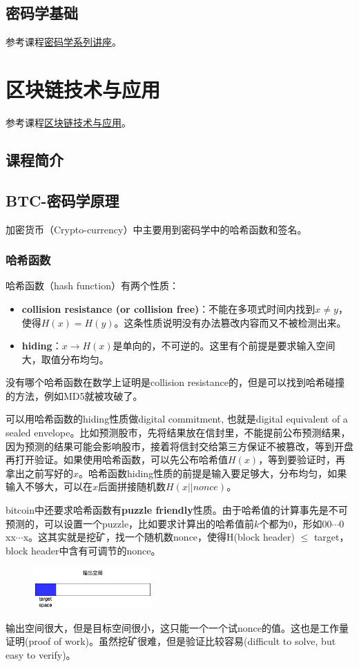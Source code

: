 \documentclass[10pt]{ctexart}
\begin{document}
\subsection{密码学基础}
参考课程\href{https://www.bilibili.com/video/BV18T411k74f/?spm_id_from=333.788&vd_source=c6586ed2410fae637f393017e00f4845}{密码学系列讲座}。
\section{区块链技术与应用}
参考课程\href{http://zhenxiao.com/blockchain/}{区块链技术与应用}。
\subsection{课程简介}
 
\subsection{BTC-密码学原理}
加密货币（Crypto-currency）中主要用到密码学中的哈希函数和签名。
\subsubsection{哈希函数}
哈希函数（hash function）有两个性质：
\begin{itemize}
    \item \textbf{collision resistance (or collision free)}：不能在多项式时间内找到$x \neq y$，使得$H(x)=H(y)$。这条性质说明没有办法篡改内容而又不被检测出来。
    \item \textbf{hiding}：$x \rightarrow H(x)$是单向的，不可逆的。这里有个前提是要求输入空间大，取值分布均匀。
\end{itemize}
没有哪个哈希函数在数学上证明是collision resistance的，但是可以找到哈希碰撞的方法，例如MD5就被攻破了。

可以用哈希函数的hiding性质做digital commitment, 也就是digital equivalent of a sealed envelope。比如预测股市，先将结果放在信封里，不能提前公布预测结果，因为预测的结果可能会影响股市，接着将信封交给第三方保证不被篡改，等到开盘再打开验证。如果使用哈希函数，可以先公布哈希值$H(x)$，等到要验证时，再拿出之前写好的$x$。哈希函数hiding性质的前提是输入要足够大，分布均匀，如果输入不够大，可以在$x$后面拼接随机数$H(x||nonce)$。

bitcoin中还要求哈希函数有\textbf{puzzle friendly}性质。由于哈希值的计算事先是不可预测的，可以设置一个puzzle，比如要求计算出的哈希值前$k$个都为0，形如$00\cdots 0 $xx$\cdots$x。这其实就是挖矿，找一个随机数nonce，使得H(block header) $\le$ target，block header中含有可调节的nonce。
\begin{figure}[H]
    \centering
    \includegraphics[width=0.4\textwidth]{courses/区块链技术与应用/lecture2/lecture1-1.png} 
\end{figure}
输出空间很大，但是目标空间很小，这只能一个一个试nonce的值。这也是工作量证明(proof of work)。虽然挖矿很难，但是验证比较容易(difficult to solve, but easy to verify)。
\end{document}

